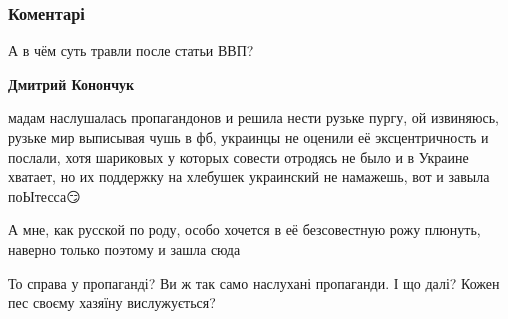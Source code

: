  
 
 
 
 
\subsubsection{Коментарі}
\label{sec:31_08_2021.fb.nikonov_sergej.1.bilchenko_eto_zhestoko.cmt}

\begin{itemize}
 
А в чём суть травли после статьи ВВП?

\begin{itemize}
 
\textbf{Дмитрий Конончук} 

мадам наслушалась пропагандонов и решила нести рузьке пургу, ой извиняюсь,
рузьке мир выписывая чушь в фб, украинцы не оценили её эксцентричность и
послали, хотя шариковых у которых совести отродясь не было и в Украине хватает,
но их поддержку на хлебушек украинский не намажешь, вот и завыла поЫтесса😏

А мне, как русской по роду, особо хочется в её безсовестную рожу плюнуть, наверно только поэтому и зашла сюда

 
То справа у пропаганді?
Ви ж так само наслухані пропаганди. І що далі?
Кожен пес своєму хазяїну вислужується?

 

\end{itemize}
\end{itemize}
